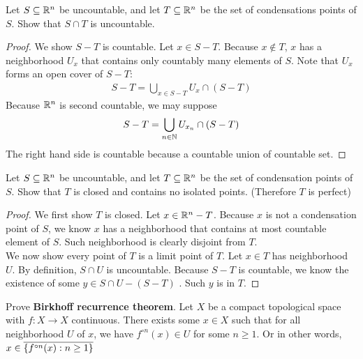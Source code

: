 \documentclass{report}
\begin{document}
\begin{question}{}{}
Let $S\subseteq \mathbb{R}^n$ be uncountable, and let $T\subseteq \mathbb{R}^n$ be the set of condensations points of $S$. Show that  $S \cap T$ is uncountable.  
\end{question}
\begin{proof}
We show $S  - T$ is countable. Let $x \in S- T$. Because $x \not \in T$, $x$ has a neighborhood $U_x$ that contains only countably many elements of $S$. Note that $U_x$ forms an open cover of  $S-T$:  
\begin{align*}
S- T = \bigcup_{x \in S-T} U_x \cap (S-T)
\end{align*}
Because $\mathbb{R}^n$ is second countable, we may suppose 
\begin{align*}
S-T = \bigcup_{n\in\mathbb{N}} U_{x_n} \cap (S-T)
\end{align*}
The right hand side is countable because a countable union of countable set. 
\end{proof}
\begin{question}{}{}
Let $S\subseteq \mathbb{R}^n$ be uncountable, and let $T\subseteq \mathbb{R}^n$ be the set of condensation points of $S$. Show that  $T$ is closed and contains no isolated points. (Therefore  $T$ is perfect)
\end{question}
\begin{proof}
We first show $T$ is closed. Let $x \in \mathbb{R}^n -T$. Because $x$ is not a condensation point of  $S$, we know  $x$ has a neighborhood that contains at most countable element of $S$. Such neighborhood is clearly disjoint from $T$. \\

We now show every point of $T$ is a limit point of $T$.  Let $x \in T$ has neighborhood $U$. By definition, $S \cap U$ is uncountable. Because $S-T$ is countable, we know the existence of some $y \in S \cap U - (S-T)$ . Such $y$ is in $T$.  
\end{proof}
\begin{question}{}{}
  Prove \textbf{Birkhoff recurrence theorem}. Let $X$ be a compact topological space with $f: X\rightarrow X$ continuous. There exists some $x \in X$ such that for all neighborhood $U$ of  $x$, we have  $f^{\circ  n}(x) \in U$ for some $n\geq 1$.  Or in other words, $x \in \overline{\left\{ f^{\circ n}(x):n\geq 1 \right\}}$
\end{question}
\end{document}
